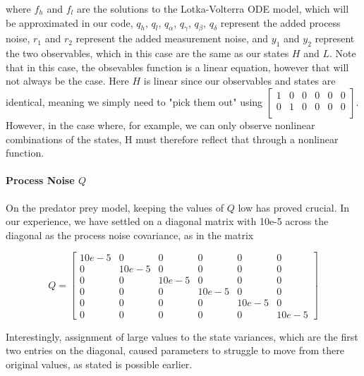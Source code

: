 where $f_h$ and $f_l$ are the solutions to the Lotka-Volterra ODE model, which will be approximated in our code, $q_h$, $q_l$, $q_{\alpha}$, $q_{\gamma}$, $q_{\beta}$, $q_{\delta}$ represent the added process noise, $r_1$ and $r_2$ represent the added measurement noise, and $y_1$ and $y_2$ represent the two observables, which in this case are the same as our states $H$ and $L$. Note that in this case, the obsevables function is a linear equation, however that will not always be the case. Here $H$ is linear since our observables and states are identical, meaning we simply need to "pick them out" using $\begin{bmatrix}
1 & 0 & 0 & 0 & 0 & 0\\
0 & 1 & 0 & 0 & 0 & 0\\
\end{bmatrix}$.
However, in the case where, for example, we can only observe nonlinear combinations of the states, H must therefore reflect that through a nonlinear function.

\paragraph{Process Noise $Q$}
On the predator prey model, keeping the values of $Q$ low has proved crucial. In our experience, we have settled on a diagonal matrix with 10e-5 across the diagonal as the process noise covariance, as in the matrix

\begin{equation}
Q = \begin{bmatrix}
10e-5 & 0 & 0 & 0 & 0 & 0\\
0 & 10e-5 & 0 & 0 & 0 & 0\\
0 & 0 & 10e-5 & 0 & 0 & 0\\
0 & 0 & 0 & 10e-5 & 0 & 0\\
0 & 0 & 0 & 0  & 10e-5 & 0\\
0 & 0 & 0 & 0 & 0 & 10e-5\end{bmatrix}
\end{equation}

Interestingly, assignment of large values to the state variances, which are the first two entries on the diagonal, caused parameters to struggle to move from there original values, as stated is possible earlier. 

